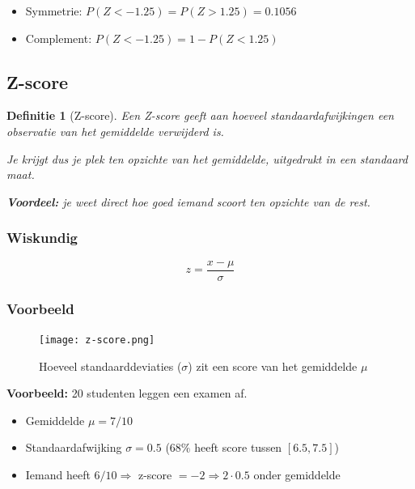 \documentclass{article}
\newtheorem{theorem}{Definitie}[section]
\begin{document}
\begin{itemize}
    \item Symmetrie: $P(Z < -1.25) = P(Z > 1.25) = 0.1056$
    \item Complement: $P(Z < -1.25) = 1- P(Z < 1.25)$
\end{itemize}

\subsection{Z-score}

\begin{theorem}[Z-score]
    Een Z-score geeft aan hoeveel standaardafwijkingen een observatie van het gemiddelde verwijderd is.

    Je krijgt dus je plek ten opzichte van het gemiddelde, uitgedrukt in een
    standaard maat.

    \textbf{Voordeel:} je weet direct hoe goed iemand scoort ten opzichte van de
    rest.
\end{theorem}

\subsubsection{Wiskundig}

\begin{equation}
    z = \frac{x - \mu}{\sigma}
\end{equation}

\subsubsection{Voorbeeld}

\begin{figure}[H]
    \centering
    \texttt{[image: z-score.png]}
    \caption{Hoeveel standaarddeviaties ($\sigma$) zit een score van het gemiddelde $\mu$}
\end{figure}

\textbf{Voorbeeld:} 20 studenten leggen een examen af.

\begin{itemize}
    \item Gemiddelde $\mu = 7/10$
    \item Standaardafwijking $\sigma = 0.5$ ($68\%$ heeft score tussen $[6.5, 7.5]$)
    \item Iemand heeft $6/10 \Rightarrow$ z-score $= -2 \Rightarrow 2\cdot 0.5$ onder gemiddelde 
\end{itemize}
\end{document}
